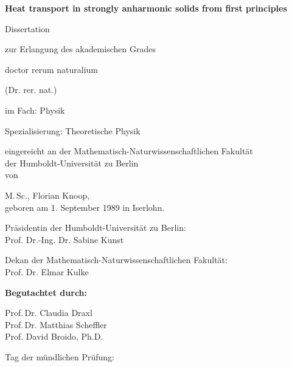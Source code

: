 \thispagestyle{empty}

\begin{fullwidth}
  \begin{center}
  \LARGE
  \textbf{Heat transport in strongly anharmonic solids from first principles}
  \\ \vspace{3em}
  
  \Large
  Dissertation 
  
  zur Erlangung des akademischen Grades 
  
  doctor rerum naturalium
  
  (Dr. rer. nat.)
  
  \vspace{3em}
    
  im Fach: Physik

Spezialisierung: Theoretische Physik 

\vspace{3em}

eingereicht an der Mathematisch-Naturwissenschaftlichen Fakultät \\
der Humboldt-Universität zu Berlin \\
von 

\vspace{3em} 

M.\,Sc., Florian Knoop, \\
geboren am 1. September 1989 in Iserlohn.

\vspace{3em}

Präsidentin der Humboldt-Universität zu Berlin: \\ Prof. Dr.-Ing. Dr. Sabine Kunst 

\vspace{3em}

Dekan der Mathematisch-Naturwissenschaftlichen Fakultät: \\ Prof. Dr. Elmar Kulke

\vspace{3em}

\vfill
\textbf{Begutachtet durch:}

\vspace{2em}

Prof.\,Dr. Claudia Draxl \\ \vspace{1em}
Prof.\,Dr. Matthias Scheffler \\ \vspace{1em}
Prof. David Broido, Ph.D.


\vspace{2em}

\flushleft Tag der mündlichen Prüfung:

\end{center}
\end{fullwidth}
